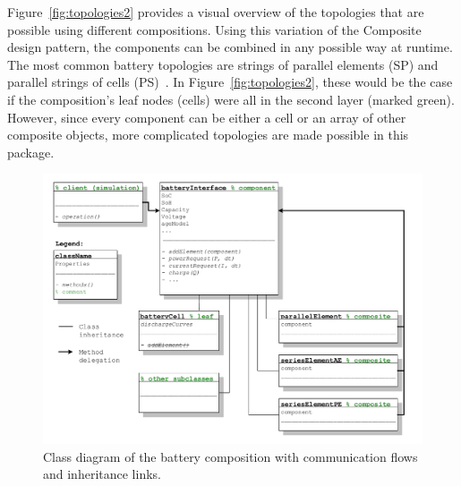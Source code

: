 Figure~\ref{fig:topologies2} provides a visual overview of the topologies that are possible using different compositions. Using this variation of the Composite design pattern, the components can be combined in any possible way at runtime. The most common battery topologies are strings of parallel elements (SP) and parallel strings of cells (PS)~\cite{cordoba-arenas_control-oriented_2015}. In Figure~\ref{fig:topologies2}, these would be the case if the composition's leaf nodes (cells) were all in the second layer (marked green). However, since every component can be either a cell or an array of other composite objects, more complicated topologies are made possible in this package. \\
\begin{figure}[t!]
	\captionsetup{type=figure}
	\centering
	\includegraphics[width=\textwidth]{composite_schema.pdf}
	\caption[Class diagram of the battery composition with communication flows and inheritance links]{Class diagram of the battery composition with communication flows and inheritance links.}
	\label{fig:composite_schema}
\end{figure}

